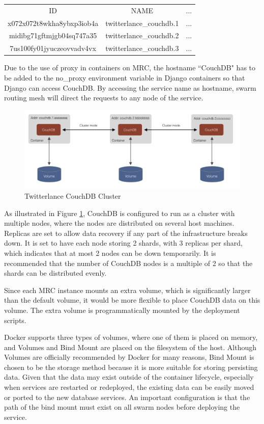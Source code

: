 \begin{center}
\begin{tabular}{ c c c }
ID & NAME &  ... \\
x072x072t8wkha8ybxp3iob4a & twitterlance\_couchdb.1 & ... \\
midibg71gftmjgb04sq747a35 & twitterlance\_couchdb.2 & ... \\
7us100fy01jyuczeovvadv4vx & twitterlance\_couchdb.3 & ... \\
\end{tabular}
\end{center}

Due to the use of proxy in containers on MRC, the hostname ``CouchDB" has to be added to the no\_proxy environment variable in Django containers so that Django can access CouchDB. By accessing the service name as hostname, swarm routing mesh will direct the requests to any node of the service.

\begin{figure}
\centerline{\includegraphics[width=6in]{Figures/Couchdb.jpg}}
\caption{Twitterlance CouchDB Cluster \label{Twitterlance CouchDB Cluster}}
\end{figure}

As illustrated in Figure \ref{Twitterlance CouchDB Cluster}, CouchDB is configured to run as a cluster with multiple nodes, where the nodes are distributed on several host machines. Replicas are set to allow data recovery if any part of the infrastructure breaks down. It is set to have each node storing 2 shards, with 3 replicas per shard, which indicates that at most 2 nodes can be down temporarily. It is recommended that the number of CouchDB nodes is a multiple of 2 so that the shards can be distributed evenly.

Since each MRC instance mounts an extra volume, which is significantly larger than the default volume, it would be more flexible to place CouchDB data on this volume. The extra volume is programmatically mounted by the deployment scripts.

Docker supports three types of volumes, where one of them is placed on memory, and Volumes and Bind Mount are placed on the filesystem of the host. Although Volumes are officially recommended by Docker for many reasons, Bind Mount is chosen to be the storage method because it is more suitable for storing persisting data. Given that the data may exist outside of the container lifecycle, especially when services are restarted or redeployed, the existing data can be easily moved or ported to the new database services. An important configuration is that the path of the bind mount must exist on all swarm nodes before deploying the service. 

